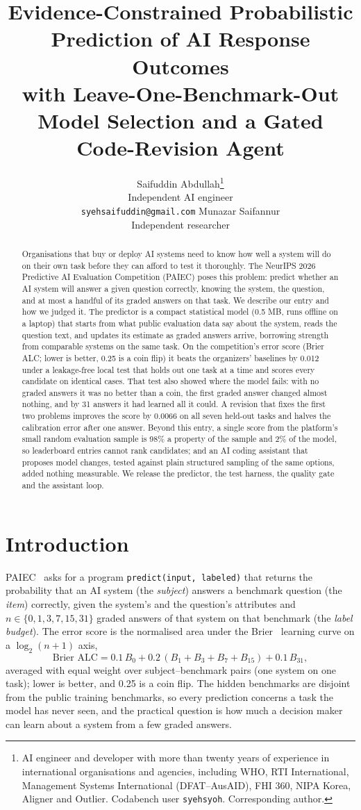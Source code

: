 \documentclass{article}
\title{Evidence-Constrained Probabilistic Prediction of AI Response Outcomes\\
with Leave-One-Benchmark-Out Model Selection and a Gated Code-Revision Agent}
\author{%
  Saifuddin Abdullah\thanks{AI engineer and developer with more than twenty years of experience in international organisations and agencies, including WHO, RTI International, Management Systems International (DFAT--AusAID), FHI 360, NIPA Korea, Aligner and Outlier. Codabench user \texttt{syehsyoh}. Corresponding author.}\\
  Independent AI engineer\\
  \texttt{syehsaifuddin@gmail.com}
  \And
  Munazar Saifannur\\
  Independent researcher
}
\begin{document}
\maketitle

\begin{abstract}
Organisations that buy or deploy AI systems need to know how well a system will do on their own task before they can afford to test it thoroughly. The NeurIPS 2026 Predictive AI Evaluation Competition (PAIEC) poses this problem: predict whether an AI system will answer a given question correctly, knowing the system, the question, and at most a handful of its graded answers on that task. We describe our entry and how we judged it. The predictor is a compact statistical model (0.5 MB, runs offline on a laptop) that starts from what public evaluation data say about the system, reads the question text, and updates its estimate as graded answers arrive, borrowing strength from comparable systems on the same task. On the competition's error score (Brier ALC; lower is better, 0.25 is a coin flip) it beats the organizers' baselines by 0.012 under a leakage-free local test that holds out one task at a time and scores every candidate on identical cases. That test also showed where the model fails: with no graded answers it was no better than a coin, the first graded answer changed almost nothing, and by 31 answers it had learned all it could. A revision that fixes the first two problems improves the score by 0.0066 on all seven held-out tasks and halves the calibration error after one answer. Beyond this entry, a single score from the platform's small random evaluation sample is 98\% a property of the sample and 2\% of the model, so leaderboard entries cannot rank candidates; and an AI coding assistant that proposes model changes, tested against plain structured sampling of the same options, added nothing measurable. We release the predictor, the test harness, the quality gate and the assistant loop.
\end{abstract}

\section{Introduction}

PAIEC~\cite{paiec} asks for a program \texttt{predict(input, labeled)} that returns the probability that an AI system (the \emph{subject}) answers a benchmark question (the \emph{item}) correctly, given the system's and the question's attributes and $n\in\{0,1,3,7,15,31\}$ graded answers of that system on that benchmark (the \emph{label budget}). The error score is the normalised area under the Brier~\cite{brier} learning curve on a $\log_2(n+1)$ axis,
\[
\text{Brier ALC} = 0.1\,B_0 + 0.2\,(B_1+B_3+B_7+B_{15}) + 0.1\,B_{31},
\]
averaged with equal weight over subject--benchmark pairs (one system on one task); lower is better, and 0.25 is a coin flip. The hidden benchmarks are disjoint from the public training benchmarks, so every prediction concerns a task the model has never seen, and the practical question is how much a decision maker can learn about a system from a few graded answers.
\end{document}
